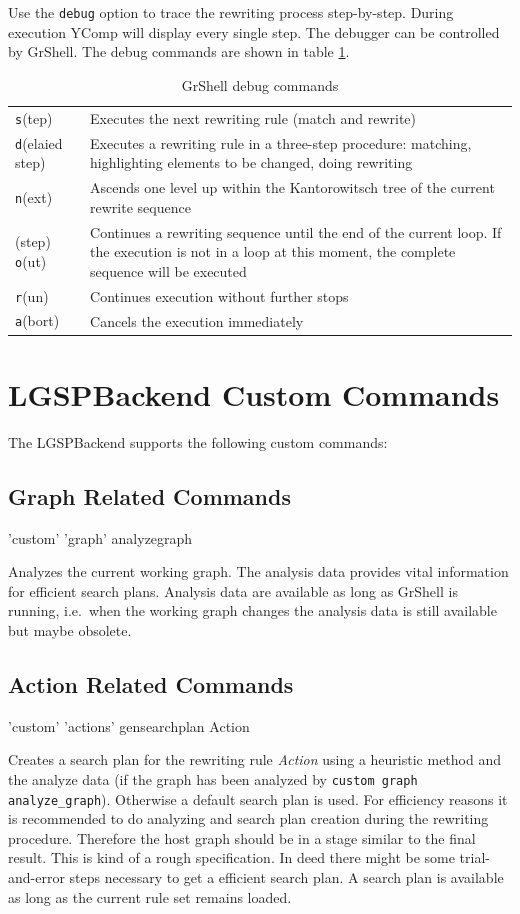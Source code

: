 Use the \texttt{debug} option to trace the rewriting process step-by-step. During execution YComp will display every single step. The debugger can be controlled by GrShell. The debug commands are shown in table \ref{tabdebug}.
\begin{table}[htbp]
  \begin{tabularx}{\linewidth}{|lX|} \hline
  \texttt{s}(tep) & Executes the next rewriting rule (match and rewrite)\\
  \texttt{d}(elaied step) & Executes a rewriting rule in a three-step procedure: matching, highlighting elements to be changed, doing rewriting \\
  \texttt{n}(ext) & Ascends one level up within the Kantorowitsch tree of the current rewrite sequence\\
  (step) \texttt{o}(ut) & Continues a rewriting sequence until the end of the current loop. If the execution is not in a loop at this moment, the complete sequence will be executed\\
  \texttt{r}(un) &  Continues execution without further stops\\
  \texttt{a}(bort) & Cancels the execution immediately\\ \hline 
  \end{tabularx}
  \caption{GrShell debug commands}
  \label{tabdebug}
\end{table}

\section{LGSPBackend Custom Commands}
\label{custom}
The LGSPBackend supports the following custom commands:

\subsection{Graph Related Commands}
\begin{rail}
  'custom' 'graph' analyzegraph
\end{rail}
Analyzes the current working graph. The analysis data provides vital information for efficient search plans. Analysis data are available as long as GrShell is running, i.e.\ when the working graph changes the analysis data is still available but maybe obsolete.

\subsection{Action Related Commands}
\begin{rail}
  'custom' 'actions' gensearchplan Action
\end{rail}
Creates a search plan for the rewriting rule \emph{Action} using a heuristic method and the analyze data (if the graph has been analyzed by \texttt{custom graph analyze\_graph}). Otherwise a default search plan is used. For efficiency reasons it is recommended to do analyzing and search plan creation during the rewriting procedure. Therefore the host graph should be in a stage similar to the final result. This is kind of a rough specification. In deed there might be some trial-and-error steps necessary to get a efficient search plan. A search plan is available as long as the current rule set remains loaded. 

